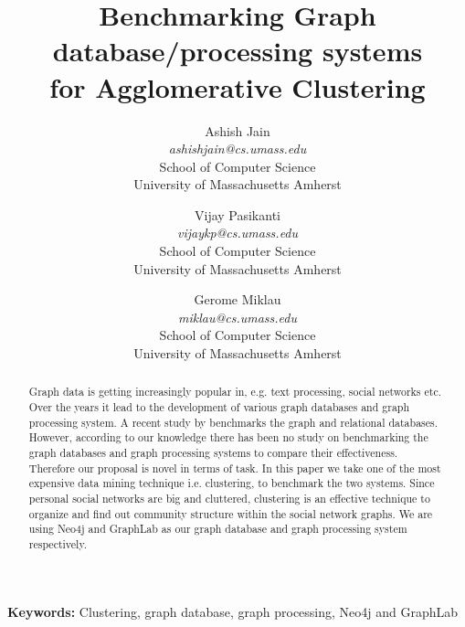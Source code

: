 \documentclass[11pt,onecolumn]{article}
\begin{document}
%
\title{Benchmarking Graph database/processing systems\\for Agglomerative Clustering}



\author{
 Ashish Jain\\
 \textit{ashishjain@cs.umass.edu}\\
School of Computer Science\\
University of Massachusetts Amherst\\
\and
 Vijay Pasikanti\\
 \textit{vijaykp@cs.umass.edu}\\
School of Computer Science\\
University of Massachusetts Amherst\\
\and
Gerome Miklau\\
\textit{miklau@cs.umass.edu}\\
School of Computer Science\\
University of Massachusetts Amherst\\
}
\maketitle

\begin{abstract}
Graph data is getting increasingly popular in, e.g. text processing, social networks etc. Over the years it lead to the development of various graph databases and graph processing system. A recent study by \cite{benchmark} benchmarks the graph and relational databases. However, according to our knowledge there has been no study on benchmarking the graph databases and graph processing systems to compare their effectiveness.  Therefore our proposal is novel in terms of task. In this paper we take one of the most expensive data mining technique i.e. clustering, to benchmark the two systems. Since personal social networks are big and cluttered, clustering is an effective technique to organize and find out community structure within the social network graphs. We are using Neo4j and GraphLab as our graph database and graph processing system respectively.
\end{abstract}


\textbf{Keywords:} Clustering, graph database, graph processing, Neo4j and GraphLab
\end{document}
